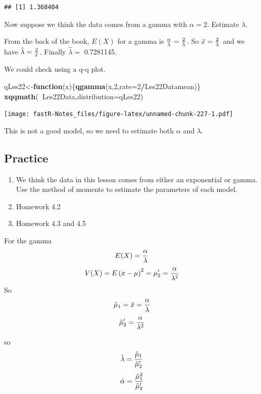 \documentclass[]{book}
\newenvironment{Shaded}{\begin{snugshade}}{\end{snugshade}}
\newcommand{\KeywordTok}[1]{\textcolor[rgb]{0.13,0.29,0.53}{\textbf{#1}}}
\newcommand{\DataTypeTok}[1]{\textcolor[rgb]{0.13,0.29,0.53}{#1}}
\newcommand{\DecValTok}[1]{\textcolor[rgb]{0.00,0.00,0.81}{#1}}
\newcommand{\ControlFlowTok}[1]{\textcolor[rgb]{0.13,0.29,0.53}{\textbf{#1}}}
\newcommand{\OperatorTok}[1]{\textcolor[rgb]{0.81,0.36,0.00}{\textbf{#1}}}
\newcommand{\NormalTok}[1]{#1}
\providecommand{\tightlist}{%
  \setlength{\itemsep}{0pt}\setlength{\parskip}{0pt}}
\theoremstyle{definition}
\theoremstyle{definition}
\theoremstyle{definition}
\theoremstyle{remark}
\begin{document}
\begin{verbatim}
## [1] 1.368404
\end{verbatim}

Now suppose we think the data comes from a gamma with \(\alpha = 2\).
Estimate \(\lambda\).

From the back of the book, \(E(X)\) for a gamma is
\({\alpha \over \lambda} = {2 \over \lambda}\). So
\(\bar{x}= {2 \over \lambda}\) and we have
\(\hat{\lambda}={2 \over \bar{x}}\). Finally \(\hat{\lambda}=\)
0.7281145.

We could check using a q-q plot.

\begin{Shaded}
\begin{Highlighting}[]
\NormalTok{qLes22<-}\ControlFlowTok{function}\NormalTok{(x)\{}\KeywordTok{qgamma}\NormalTok{(x,}\DecValTok{2}\NormalTok{,}\DataTypeTok{rate=}\DecValTok{2}\OperatorTok{/}\NormalTok{Les22Datamean)\}}
\KeywordTok{xqqmath}\NormalTok{(}\OperatorTok{~}\NormalTok{Les22Data,}\DataTypeTok{distribution=}\NormalTok{qLes22)}
\end{Highlighting}
\end{Shaded}

\texttt{[image: fastR-Notes\_files/figure-latex/unnamed-chunk-227-1.pdf]}

This is not a good model, so we need to estimate both \(\alpha\) and
\(\lambda\).

\subsection{Practice}\label{practice-6}

\begin{enumerate}
\def\labelenumi{\arabic{enumi}.}
\tightlist
\item
  We think the data in this lesson comes from either an exponential or
  gamma. Use the method of moments to estimate the parameters of each
  model.
\item
  Homework 4.2
\item
  Homework 4.3 and 4.5
\end{enumerate}

For the gamma \[E(X)={\alpha \over \lambda}\]
\[V(X)=E\left( x-\mu  \right)^2=\mu_{2}'={\alpha \over \lambda^2}\] So
\[\hat{\mu}_{1}=\bar{x}={\alpha \over \lambda}\]
\[\hat{\mu}_{2}'={\alpha \over \lambda^2}\]

so \[\hat{\lambda}={\hat{\mu}_{1} \over \hat{\mu}_{2}'}\]
\[\hat{\alpha}={\hat{\mu}_{1}^{2} \over \hat{\mu}_{2}'}\]
\end{document}
